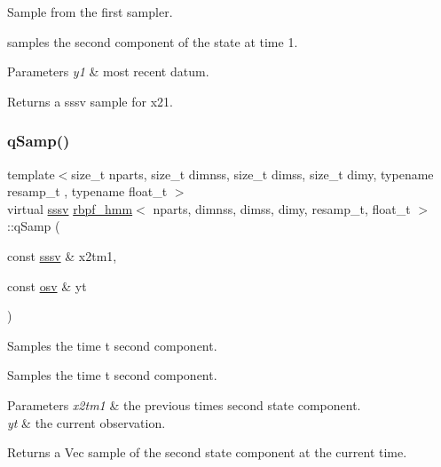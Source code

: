 Sample from the first sampler. 

samples the second component of the state at time 1. 
\begin{DoxyParams}{Parameters}
{\em y1} & most recent datum. \\
\hline
\end{DoxyParams}
\begin{DoxyReturn}{Returns}
a sssv sample for x21. 
\end{DoxyReturn}
\mbox{\label{classrbpf__hmm_a449e0c123c92bbe4fedacad65f9ba7be}} 
\subsubsection{\texorpdfstring{q\+Samp()}{qSamp()}}
{\footnotesize\ttfamily template$<$size\+\_\+t nparts, size\+\_\+t dimnss, size\+\_\+t dimss, size\+\_\+t dimy, typename resamp\+\_\+t , typename float\+\_\+t $>$ \\
virtual \hyperlink{classrbpf__hmm_a28e8ad1d93bcf53cb74603f74826a81c}{sssv} \hyperlink{classrbpf__hmm}{rbpf\+\_\+hmm}$<$ nparts, dimnss, dimss, dimy, resamp\+\_\+t, float\+\_\+t $>$\+::q\+Samp (\begin{DoxyParamCaption}\item[{const \hyperlink{classrbpf__hmm_a28e8ad1d93bcf53cb74603f74826a81c}{sssv} \&}]{x2tm1,  }\item[{const \hyperlink{classrbpf__hmm_adafd37687fdd3bb776d3d33a5b0e7080}{osv} \&}]{yt }\end{DoxyParamCaption})\hspace{0.3cm}{\ttfamily [pure virtual]}}



Samples the time t second component. 

Samples the time t second component. 
\begin{DoxyParams}{Parameters}
{\em x2tm1} & the previous time\textquotesingle{}s second state component. \\
\hline
{\em yt} & the current observation. \\
\hline
\end{DoxyParams}
\begin{DoxyReturn}{Returns}
a Vec sample of the second state component at the current time. 
\end{DoxyReturn}
\mbox{\label{classrbpf__hmm_ae91a14844119ab697bbbec93ed30972b}} 

